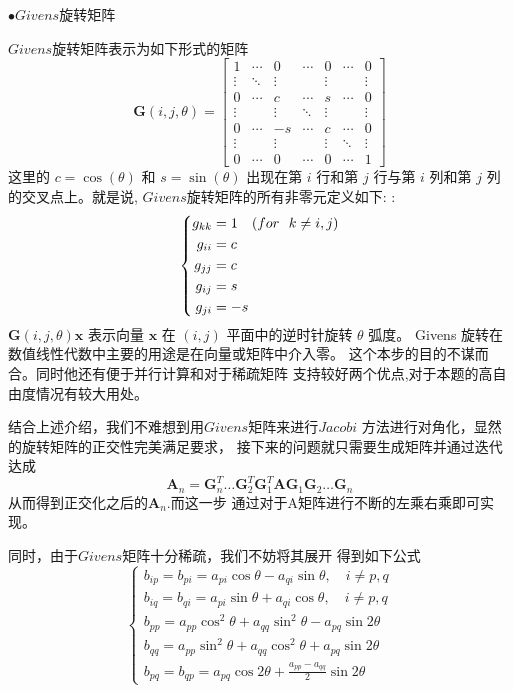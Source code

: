 \documentclass[11pt, a4paper, oneside]{ctexart}
\begin{document}
{{{$\bullet Givens$旋转矩阵

$Givens$旋转矩阵表示为如下形式的矩阵
$$
\boldsymbol G(i, j, \theta)=\left[\begin{array}{ccccccc}
1 & \cdots & 0 & \cdots & 0 & \cdots & 0 \\
\vdots & \ddots & \vdots & & \vdots & & \vdots \\
0 & \cdots & c & \cdots & s & \cdots & 0 \\
\vdots & & \vdots & \ddots & \vdots & & \vdots \\
0 & \cdots & -s & \cdots & c & \cdots & 0 \\
\vdots & & \vdots & & \vdots & \ddots & \vdots \\
0 & \cdots & 0 & \cdots & 0 & \cdots & 1
\end{array}\right]
$$
这里的 $c=\cos (\theta)$ 和 $s=\sin (\theta)$ 出现在第 $i$ 行和第 $j$ 行与第 $i$ 列和第 $j$ 列的交叉点上。就是说, $Givens$旋转矩阵的所有非零元定义如下: :
$$
    \left\{
        \begin{aligned}
            g_{k k} &=1 \quad \text ({ for \ \ } k \neq i, j) \\
            g_{i i} &=c \\
            g_{j j} &=c \\
            g_{i j} &=s \\
            g_{j i} &=-s
        \end{aligned}
        \right.
$$
$\boldsymbol G(i, j, \theta) \boldsymbol x$  表示向量 $\boldsymbol{x}$ 在 $(i, j)$ 平面中的逆时针旋转 $\theta$ 弧度。
Givens 旋转在数值线性代数中主要的用途是在向量或矩阵中介入零。
这个本步的目的不谋而合。同时他还有便于并行计算和对于稀疏矩阵
支持较好两个优点,对于本题的高自由度情况有较大用处。

结合上述介绍，我们不难想到用$Givens$矩阵来进行$Jacobi$
方法进行对角化，显然的旋转矩阵的正交性完美满足要求，
接下来的问题就只需要生成矩阵并通过迭代达成
$$\boldsymbol {A} _n=\boldsymbol G_n^T \dots\boldsymbol G_2^T \boldsymbol G_1^T 
\boldsymbol {A} 
\boldsymbol G_1\boldsymbol G_2\dots \boldsymbol G_n$$
从而得到正交化之后的$\boldsymbol A_n$.而这一步
通过对于A矩阵进行不断的左乘右乘即可实现。

同时，由于$Givens$矩阵十分稀疏，我们不妨将其展开
得到如下公式
$$
    \left\{\begin{array}{l}
    	b_{i p}=b_{p i}=a_{p i} \cos \theta-a_{q i} \sin \theta, \quad i \neq p, q \\
    	b_{i q}=b_{q i}=a_{p i} \sin \theta+a_{q i} \cos \theta, \quad i \neq p, q \\
    	b_{p p}=a_{p p} \cos ^{2} \theta+a_{q q} \sin ^{2} \theta-a_{p q} \sin 2 \theta \\
    	b_{q q}=a_{p p} \sin ^{2} \theta+a_{q q} \cos ^{2} \theta+a_{p q} \sin 2 \theta \\
    	b_{p q}=b_{q p}=a_{p q} \cos 2 \theta+\frac{a_{p p}-a_{q q}}{2} \sin 2 \theta
    \end{array}\right.
    $$

}}}
\end{document}

